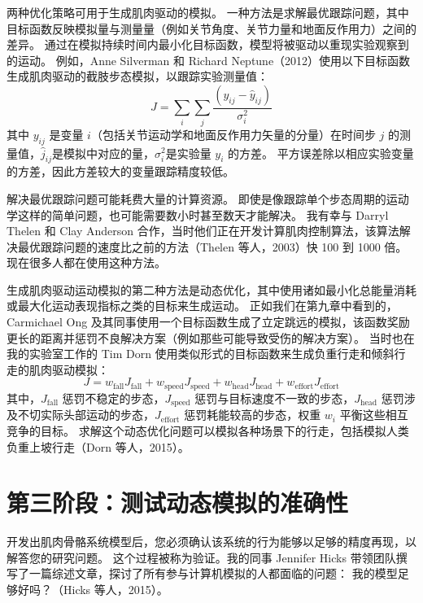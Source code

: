 两种优化策略可用于生成肌肉驱动的模拟。
一种方法是求解最优跟踪问题，其中目标函数反映模拟量与测量量（例如关节角度、关节力量和地面反作用力）之间的差异。
通过在模拟持续时间内最小化目标函数，模型将被驱动以重现实验观察到的运动。
例如，Anne Silverman 和 Richard Neptune（2012）使用以下目标函数生成肌肉驱动的截肢步态模拟，以跟踪实验测量值：
%
\begin{equation}
	J = \sum_{i} \sum_{j} \frac{(y_{ij} - \hat{y}_{ij})}{\sigma_i^2} \label{eq:10_2}
\end{equation}
%
其中 $y_{ij}$ 是变量 $i$（包括关节运动学和地面反作用力矢量的分量）在时间步 $j$ 的测量值，$\hat{j}_{ij}$是模拟中对应的量，$\sigma_i^2$是实验量 $y_i$ 的方差。
平方误差除以相应实验变量的方差，因此方差较大的变量跟踪精度较低。


解决最优跟踪问题可能耗费大量的计算资源。
即使是像跟踪单个步态周期的运动学这样的简单问题，也可能需要数小时甚至数天才能解决。
我有幸与 Darryl Thelen 和 Clay Anderson 合作，当时他们正在开发计算肌肉控制算法，该算法解决最优跟踪问题的速度比之前的方法（Thelen 等人，2003）快 100 到 1000 倍。
现在很多人都在使用这种方法。


生成肌肉驱动运动模拟的第二种方法是动态优化，其中使用诸如最小化总能量消耗或最大化运动表现指标之类的目标来生成运动。
正如我们在第九章中看到的，Carmichael Ong 及其同事使用一个目标函数生成了立定跳远的模拟，该函数奖励更长的距离并惩罚不良解决方案（例如那些可能导致受伤的解决方案）。
当时也在我的实验室工作的 Tim Dorn 使用类似形式的目标函数来生成负重行走和倾斜行走的肌肉驱动模拟：
%
\begin{equation}
	J = w_{\text{fall}} J_{\text{fall}} +
		w_{\text{speed}} J_{\text{speed}} + 
		w_{\text{head}} J_{\text{head}} + 
		w_{\text{effort}} J_{\text{effort}} \label{eq:10_3}
\end{equation}
%
其中，$J_{\text{fall}}$ 惩罚不稳定的步态，$J_{\text{speed}}$ 惩罚与目标速度不一致的步态，$J_{\text{head}}$ 惩罚涉及不切实际头部运动的步态，$J_{\text{effort}}$ 惩罚耗能较高的步态，权重 $w_i$ 平衡这些相互竞争的目标。
求解这个动态优化问题可以模拟各种场景下的行走，包括模拟人类负重上坡行走（Dorn 等人，2015）。


\section{第三阶段：测试动态模拟的准确性}

开发出肌肉骨骼系统模型后，您必须确认该系统的行为能够以足够的精度再现，以解答您的研究问题。
这个过程被称为验证。我的同事 Jennifer Hicks 带领团队撰写了一篇综述文章，探讨了所有参与计算机模拟的人都面临的问题：
我的模型足够好吗？（Hicks 等人，2015）。


